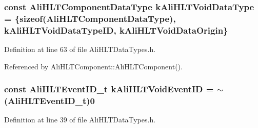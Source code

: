 \subsubsection{\setlength{\rightskip}{0pt plus 5cm}const {\bf Ali\-HLTComponent\-Data\-Type} {\bf k\-Ali\-HLTVoid\-Data\-Type} = \{sizeof({\bf Ali\-HLTComponent\-Data\-Type}), k\-Ali\-HLTVoid\-Data\-Type\-ID, k\-Ali\-HLTVoid\-Data\-Origin\}}\label{AliHLTDataTypes_8h_a14}




Definition at line 63 of file Ali\-HLTData\-Types.h.

Referenced by Ali\-HLTComponent::Ali\-HLTComponent().
\subsubsection{\setlength{\rightskip}{0pt plus 5cm}const {\bf Ali\-HLTEvent\-ID\_\-t} {\bf k\-Ali\-HLTVoid\-Event\-ID} = $\sim$({\bf Ali\-HLTEvent\-ID\_\-t})0}\label{AliHLTDataTypes_8h_a9}




Definition at line 39 of file Ali\-HLTData\-Types.h.